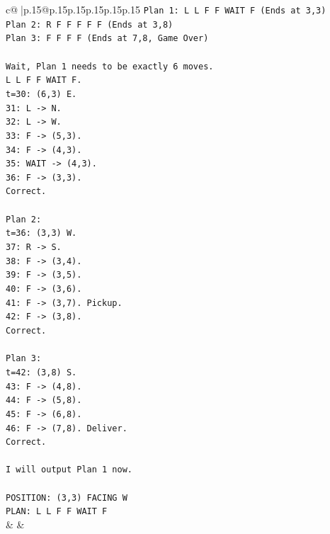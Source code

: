 \documentclass{article}
\begin{document}
{\begin{supertabular}{c@{$\;$}|p{.15\linewidth}@{}p{.15\linewidth}p{.15\linewidth}p{.15\linewidth}p{.15\linewidth}p{.15\linewidth}}
{{{\texttt{Plan 1: L L F F WAIT F (Ends at 3,3)} \\
\texttt{Plan 2: R F F F F F (Ends at 3,8)} \\
\texttt{Plan 3: F F F F (Ends at 7,8, Game Over)} \\
\\ 
\texttt{Wait, Plan 1 needs to be exactly 6 moves.} \\
\texttt{L L F F WAIT F.} \\
\texttt{t=30: (6,3) E.} \\
\texttt{31: L {-}> N.} \\
\texttt{32: L {-}> W.} \\
\texttt{33: F {-}> (5,3).} \\
\texttt{34: F {-}> (4,3).} \\
\texttt{35: WAIT {-}> (4,3).} \\
\texttt{36: F {-}> (3,3).} \\
\texttt{Correct.} \\
\\ 
\texttt{Plan 2:} \\
\texttt{t=36: (3,3) W.} \\
\texttt{37: R {-}> S.} \\
\texttt{38: F {-}> (3,4).} \\
\texttt{39: F {-}> (3,5).} \\
\texttt{40: F {-}> (3,6).} \\
\texttt{41: F {-}> (3,7). Pickup.} \\
\texttt{42: F {-}> (3,8).} \\
\texttt{Correct.} \\
\\ 
\texttt{Plan 3:} \\
\texttt{t=42: (3,8) S.} \\
\texttt{43: F {-}> (4,8).} \\
\texttt{44: F {-}> (5,8).} \\
\texttt{45: F {-}> (6,8).} \\
\texttt{46: F {-}> (7,8). Deliver.} \\
\texttt{Correct.} \\
\\ 
\texttt{I will output Plan 1 now.} \\
\\ 
\texttt{POSITION: (3,3) FACING W} \\
\texttt{PLAN: L L F F WAIT F} \\
            }
        }
    }
    & & \\ \\


\end{supertabular}}
\end{document}
